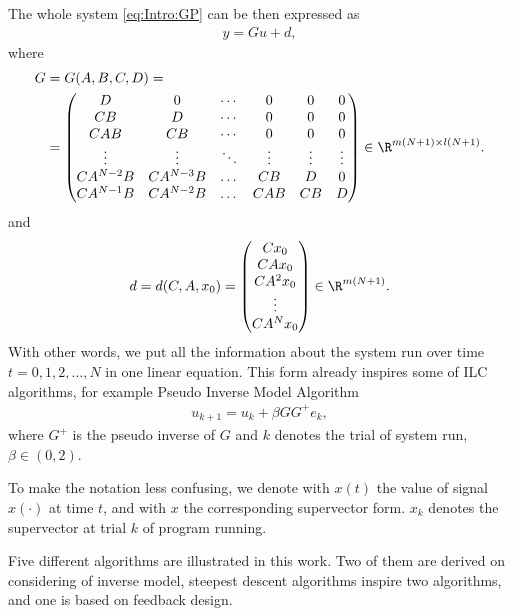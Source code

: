 The whole system \eqref{eq:Intro:GP} can be then expressed as 
\begin{align}
\label{eq:Intro:y = Gu + d}
y = G u + d, 
\end{align}
where 
\begin{align}
\label{eq:Intro:Gmatrix}
\begin{split}
G &= G(A,B,C,D) = \\
&=  \begin{pmatrix}
D & 0 & \cdots & 0 & 0 & 0 \\
CB & D & \cdots & 0 & 0 & 0\\
CAB & CB & \cdots & 0 & 0 & 0\\
\vdots & \vdots & \ddots & \vdots  & \vdots & \vdots \\
CA^{N-2} B & CA^{N-3} B &\dots &CB & D& 0\\
CA^{N-1} B & CA^{N-2} B &\dots &CAB & CB& D\\
\end{pmatrix} \in \R^{m(N+1)\times l(N+1)}.
\end{split}
\end{align}
and 
\begin{align}
d = d(C,A,x_0) = \begin{pmatrix}
C x_0 \\ CA x_0 \\ CA^2 x_0 \\ \vdots \\ CA^Nx_0
\end{pmatrix} \in \R^{m(N+1)}.
\end{align}
With other words, we put all the information about the system run over time $t = 0, 1, 2, \dots, N$ in one linear equation. This form already inspires some of ILC algorithms, for example Pseudo Inverse Model Algorithm 
\begin{align}
u_{k+1} = u_k + \beta G G^+ e_k, 
\end{align}
where $G^+$ is the pseudo inverse of $G$ and $k$ denotes the trial of system run, $\beta \in (0,2)$. 

To make the notation less confusing, we denote with $x(t)$ the value of signal $x(\cdot)$ at time $t$, and with $x$ the corresponding supervector form. $x_k$ denotes the supervector at trial $k$ of program running.

Five different algorithms are illustrated in this work. Two of them are derived on considering of inverse model, steepest descent algorithms inspire two algorithms, and one is based on feedback design. 

